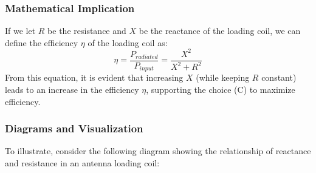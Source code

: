 \subsubsection{Mathematical Implication}
If we let \( R \) be the resistance and \( X \) be the reactance of the loading coil, we can define the efficiency \( \eta \) of the loading coil as:
\[
\eta = \frac{P_{radiated}}{P_{input}} = \frac{X^2}{X^2 + R^2}
\]
From this equation, it is evident that increasing \( X \) (while keeping \( R \) constant) leads to an increase in the efficiency \( \eta \), supporting the choice (C) to maximize efficiency.

\subsubsection{Diagrams and Visualization}
To illustrate, consider the following diagram showing the relationship of reactance and resistance in an antenna loading coil:

